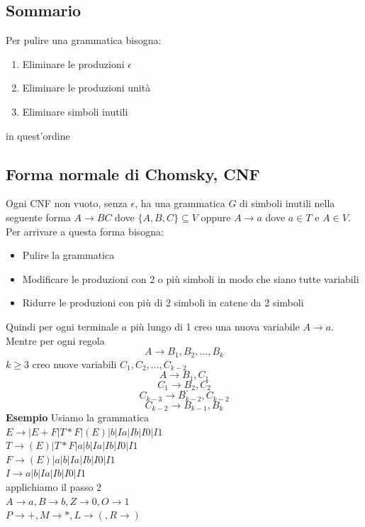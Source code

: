 \documentclass[12pt]{article}
\begin{document}
\subsection{Sommario} 
Per pulire una grammatica bisogna: 
\begin{enumerate}
  \item Eliminare le produzioni $\epsilon$
  \item Eliminare le produzioni unità
  \item Eliminare simboli inutili
\end{enumerate}
in quest'ordine

\subsection{Forma normale di Chomsky, CNF}
Ogni CNF non vuoto, senza $\epsilon$, ha una grammatica $G$ di simboli inutili nella seguente forma 
$A \rightarrow BC$ dove $\{A,B,C\} \subseteq V$ oppure
$A \rightarrow a$ dove $a\in T$ e $A \in V$.
\\ Per arrivare a questa forma bisogna: 
\begin{itemize}
  \item Pulire la grammatica 
  \item Modificare le produzioni con 2 o più simboli in modo che siano tutte variabili 
  \item Ridurre le produzioni con più di 2 simboli in catene da 2 simboli
\end{itemize}
Quindi per ogni terminale $a$ più lungo di 1 creo una nuova variabile $A \rightarrow a$.
Mentre per ogni regola 
\[ A \rightarrow B_1,B_2,...,B_k \]
$k \geq 3$ creo nuove variabili $C_1, C_2, ..., C_{k-2}$
\[ A \rightarrow B_1, C_1 \]
\[ C_1 \rightarrow B_2, C_2 \]
\[...\]
\[ C_{k-3} \rightarrow B_{k-2}, C_{k-2} \]
\[ C_{k-2} \rightarrow B_{k-1}, B_k \]
\textbf{Esempio}
Usiamo la grammatica 
\\ $E\rightarrow | E+F | T*F | (E) | b | Ia | Ib | I0 | I1   $
\\ $T\rightarrow (E) | T*F | a | b | Ia | Ib | I0 | I1$
\\ $F\rightarrow (E)| a | b | Ia | Ib | I0 | I1   $
\\ $I\rightarrow a | b | Ia | Ib | I0 | I1  $
\vspace{5mm}
\\ applichiamo il passo 2
\\ $A \rightarrow a, B \rightarrow b, Z \rightarrow 0, O \rightarrow 1 $
\\ $P \rightarrow +, M \rightarrow *, L \rightarrow (, R \rightarrow ) $
\end{document}
